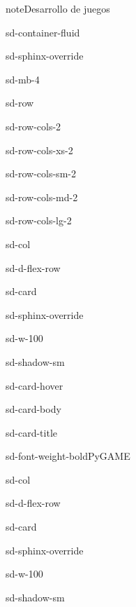 \documentclass[letterpaper,10pt,spanish]{sphinxmanual}
\begin{document}
\begin{sphinxadmonition}{note}{Desarrollo de juegos}
\begin{sphinxuseclass}{sd-container-fluid}
\begin{sphinxuseclass}{sd-sphinx-override}
\begin{sphinxuseclass}{sd-mb-4}
\begin{sphinxuseclass}{sd-row}
\begin{sphinxuseclass}{sd-row-cols-2}
\begin{sphinxuseclass}{sd-row-cols-xs-2}
\begin{sphinxuseclass}{sd-row-cols-sm-2}
\begin{sphinxuseclass}{sd-row-cols-md-2}
\begin{sphinxuseclass}{sd-row-cols-lg-2}
\begin{sphinxuseclass}{sd-col}
\begin{sphinxuseclass}{sd-d-flex-row}
\begin{sphinxuseclass}{sd-card}
\begin{sphinxuseclass}{sd-sphinx-override}
\begin{sphinxuseclass}{sd-w-100}
\begin{sphinxuseclass}{sd-shadow-sm}
\begin{sphinxuseclass}{sd-card-hover}
\begin{sphinxuseclass}{sd-card-body}
\begin{sphinxuseclass}{sd-card-title}
\begin{sphinxuseclass}{sd-font-weight-bold}PyGAME
\end{sphinxuseclass}
\end{sphinxuseclass}
\end{sphinxuseclass}
\noindent{}
\end{sphinxuseclass}
\end{sphinxuseclass}
\end{sphinxuseclass}
\end{sphinxuseclass}
\end{sphinxuseclass}
\end{sphinxuseclass}
\end{sphinxuseclass}
\begin{sphinxuseclass}{sd-col}
\begin{sphinxuseclass}{sd-d-flex-row}
\begin{sphinxuseclass}{sd-card}
\begin{sphinxuseclass}{sd-sphinx-override}
\begin{sphinxuseclass}{sd-w-100}
\begin{sphinxuseclass}{sd-shadow-sm}

\end{sphinxuseclass}
\end{sphinxuseclass}
\end{sphinxuseclass}
\end{sphinxuseclass}
\end{sphinxuseclass}
\end{sphinxuseclass}
\end{sphinxuseclass}
\end{sphinxuseclass}
\end{sphinxuseclass}
\end{sphinxuseclass}
\end{sphinxuseclass}
\end{sphinxuseclass}
\end{sphinxuseclass}
\end{sphinxuseclass}
\end{sphinxuseclass}
\end{sphinxadmonition}
\end{document}
